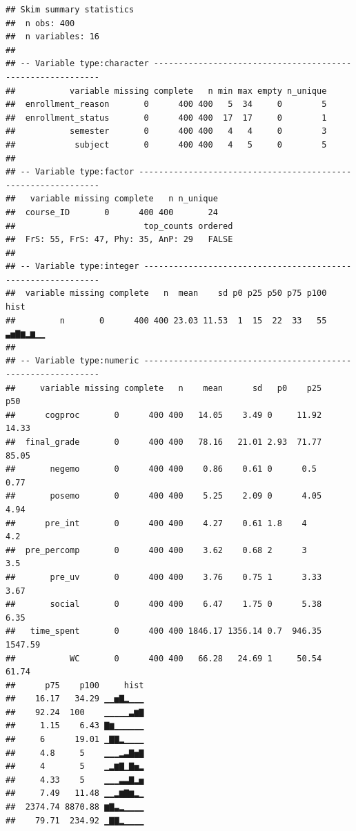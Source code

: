 \documentclass[]{apa6}
\theoremstyle{definition}
\theoremstyle{definition}
\theoremstyle{definition}
\theoremstyle{remark}
\begin{document}
\begin{verbatim}
## Skim summary statistics
##  n obs: 400 
##  n variables: 16 
## 
## -- Variable type:character -----------------------------------------------------------
##           variable missing complete   n min max empty n_unique
##  enrollment_reason       0      400 400   5  34     0        5
##  enrollment_status       0      400 400  17  17     0        1
##           semester       0      400 400   4   4     0        3
##            subject       0      400 400   4   5     0        5
## 
## -- Variable type:factor --------------------------------------------------------------
##   variable missing complete   n n_unique
##  course_ID       0      400 400       24
##                          top_counts ordered
##  FrS: 55, FrS: 47, Phy: 35, AnP: 29   FALSE
## 
## -- Variable type:integer -------------------------------------------------------------
##  variable missing complete   n  mean    sd p0 p25 p50 p75 p100     hist
##         n       0      400 400 23.03 11.53  1  15  22  33   55 ▃▅▇▆▂▆▁▁
## 
## -- Variable type:numeric -------------------------------------------------------------
##     variable missing complete   n    mean      sd   p0    p25     p50
##      cogproc       0      400 400   14.05    3.49 0     11.92   14.33
##  final_grade       0      400 400   78.16   21.01 2.93  71.77   85.05
##       negemo       0      400 400    0.86    0.61 0      0.5     0.77
##       posemo       0      400 400    5.25    2.09 0      4.05    4.94
##      pre_int       0      400 400    4.27    0.61 1.8    4       4.2 
##  pre_percomp       0      400 400    3.62    0.68 2      3       3.5 
##       pre_uv       0      400 400    3.76    0.75 1      3.33    3.67
##       social       0      400 400    6.47    1.75 0      5.38    6.35
##   time_spent       0      400 400 1846.17 1356.14 0.7  946.35 1547.59
##           WC       0      400 400   66.28   24.69 1     50.54   61.74
##      p75    p100     hist
##    16.17   34.29 ▁▁▅▇▂▁▁▁
##    92.24  100    ▁▁▁▁▁▃▆▇
##     1.15    6.43 ▇▆▁▁▁▁▁▁
##     6      19.01 ▁▇▇▂▁▁▁▁
##     4.8     5    ▁▁▁▂▃▇▅▇
##     4       5    ▁▂▆▇▁▇▅▂
##     4.33    5    ▁▁▁▃▃▇▂▅
##     7.49   11.48 ▁▁▂▆▇▆▂▁
##  2374.74 8870.88 ▆▇▃▂▁▁▁▁
##    79.71  234.92 ▁▇▇▂▁▁▁▁
\end{verbatim}
\end{document}
